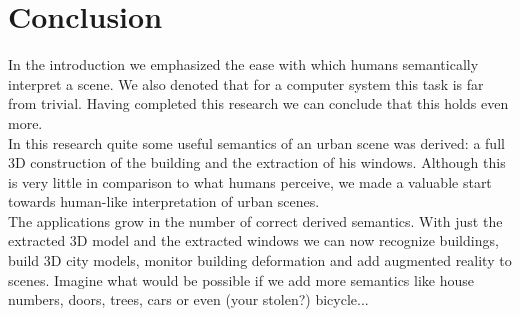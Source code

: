 \section{Conclusion}

In the introduction we emphasized the ease with which humans semantically
interpret a scene.  We also denoted that for a computer system this task is far
from trivial. Having completed this research we can conclude that this holds even
more.\\

In this research quite some useful semantics of an urban scene was derived: a
full 3D construction of the building and the extraction of his windows.
Although this is very little in comparison to what humans perceive, we made a
valuable start towards human-like interpretation of urban scenes.\\

The applications grow in the number of correct derived semantics. With just the
extracted 3D model and the extracted windows we can now recognize buildings,
build 3D city models, monitor building deformation and add augmented reality
to scenes.  Imagine what would be possible if we add more semantics like
house numbers, doors, trees, cars or even (your stolen?) bicycle...
